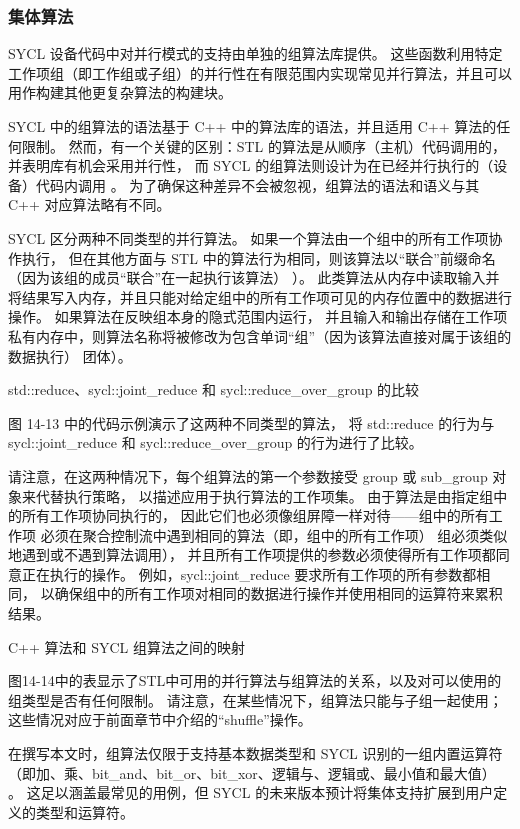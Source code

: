 \subsubsection{集体算法}
SYCL 设备代码中对并行模式的支持由单独的组算法库提供。 
这些函数利用特定工作项组（即工作组或子组）的并行性在有限范围内实现常见并行算法，并且可以用作构建其他更复杂算法的构建块。

SYCL 中的组算法的语法基于 C++ 中的算法库的语法，并且适用 C++ 算法的任何限制。 
然而，有一个关键的区别：STL 的算法是从顺序（主机）代码调用的，并表明库有机会采用并行性，
而 SYCL 的组算法则设计为在已经并行执行的（设备）代码内调用 。 
为了确保这种差异不会被忽视，组算法的语法和语义与其 C++ 对应算法略有不同。

SYCL 区分两种不同类型的并行算法。 如果一个算法由一个组中的所有工作项协作执行，
但在其他方面与 STL 中的算法行为相同，则该算法以“联合”前缀命名（因为该组的成员“联合”在一起执行该算法） ）。 
此类算法从内存中读取输入并将结果写入内存，并且只能对给定组中的所有工作项可见的内存位置中的数据进行操作。 
如果算法在反映组本身的隐式范围内运行，
并且输入和输出存储在工作项私有内存中，则算法名称将被修改为包含单词“组”（因为该算法直接对属于该组的数据执行） 团体）。

{\color{red} std::reduce、sycl::joint\_reduce 和 sycl::reduce\_over\_group 的比较}

图 14-13 中的代码示例演示了这两种不同类型的算法，
将 std::reduce 的行为与 sycl::joint\_reduce 和 sycl::reduce\_over\_group 的行为进行了比较。

请注意，在这两种情况下，每个组算法的第一个参数接受 group 或 sub\_group 对象来代替执行策略，
以描述应用于执行算法的工作项集。 
由于算法是由指定组中的所有工作项协同执行的，
因此它们也必须像组屏障一样对待——组中的所有工作项
必须在聚合控制流中遇到相同的算法（即，组中的所有工作项） 组必须类似地遇到或不遇到算法调用），
并且所有工作项提供的参数必须使得所有工作项都同意正在执行的操作。 
例如，sycl::joint\_reduce 要求所有工作项的所有参数都相同，
以确保组中的所有工作项对相同的数据进行操作并使用相同的运算符来累积结果。

{\color{red} C++ 算法和 SYCL 组算法之间的映射}

图14-14中的表显示了STL中可用的并行算法与组算法的关系，以及对可以使用的组类型是否有任何限制。 
请注意，在某些情况下，组算法只能与子组一起使用； 这些情况对应于前面章节中介绍的“shuffle”操作。

在撰写本文时，组算法仅限于支持基本数据类型和 SYCL 识别的一组内置运算符
（即加、乘、bit\_and、bit\_or、bit\_xor、逻辑与、逻辑或、最小值和最大值） 。 
这足以涵盖最常见的用例，但 SYCL 的未来版本预计将集体支持扩展到用户定义的类型和运算符。

